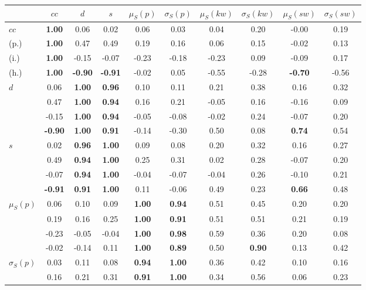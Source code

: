 \begin{table*}[h!]
\begin{center}
\begin{tabular}{| l || c | c | c | c | c | c | c | c | c |}\hline
 & $cc$ & $d$ & $s$ & $\mu_S(p)$ & $\sigma_S(p)$ & $\mu_S(kw)$ & $\sigma_S(kw)$ & $\mu_S(sw)$ & $\sigma_S(sw)$ \\\hline\hline
$cc$ & {\bf 1.00} & 0.06 & 0.02 & 0.06 & 0.03 & 0.04 & 0.20 & -0.00 & 0.19 \\
(p.) & {\bf 1.00} & 0.47 & 0.49 & 0.19 & 0.16 & 0.06 & 0.15 & -0.02 & 0.13 \\
(i.) & {\bf 1.00} & -0.15 & -0.07 & -0.23 & -0.18 & -0.23 & 0.09 & -0.09 & 0.17 \\
(h.) & {\bf 1.00} & {\bf -0.90} & {\bf -0.91} & -0.02 & 0.05 & -0.55 & -0.28 & {\bf -0.70} & -0.56 \\\hline
$d$ & 0.06 & {\bf 1.00} & {\bf 0.96} & 0.10 & 0.11 & 0.21 & 0.38 & 0.16 & 0.32 \\
 & 0.47 & {\bf 1.00} & {\bf 0.94} & 0.16 & 0.21 & -0.05 & 0.16 & -0.16 & 0.09 \\
 & -0.15 & {\bf 1.00} & {\bf 0.94} & -0.05 & -0.08 & -0.02 & 0.24 & -0.07 & 0.20 \\
 & {\bf -0.90} & {\bf 1.00} & {\bf 0.91} & -0.14 & -0.30 & 0.50 & 0.08 & {\bf 0.74} & 0.54 \\\hline
$s$ & 0.02 & {\bf 0.96} & {\bf 1.00} & 0.09 & 0.08 & 0.20 & 0.32 & 0.16 & 0.27 \\
 & 0.49 & {\bf 0.94} & {\bf 1.00} & 0.25 & 0.31 & 0.02 & 0.28 & -0.07 & 0.20 \\
 & -0.07 & {\bf 0.94} & {\bf 1.00} & -0.04 & -0.07 & -0.04 & 0.26 & -0.10 & 0.21 \\
 & {\bf -0.91} & {\bf 0.91} & {\bf 1.00} & 0.11 & -0.06 & 0.49 & 0.23 & {\bf 0.66} & 0.48 \\\hline
$\mu_S(p)$ & 0.06 & 0.10 & 0.09 & {\bf 1.00} & {\bf 0.94} & 0.51 & 0.45 & 0.20 & 0.20 \\
 & 0.19 & 0.16 & 0.25 & {\bf 1.00} & {\bf 0.91} & 0.51 & 0.51 & 0.21 & 0.19 \\
 & -0.23 & -0.05 & -0.04 & {\bf 1.00} & {\bf 0.98} & 0.59 & 0.36 & 0.20 & 0.08 \\
 & -0.02 & -0.14 & 0.11 & {\bf 1.00} & {\bf 0.89} & 0.50 & {\bf 0.90} & 0.13 & 0.42 \\\hline
$\sigma_S(p)$ & 0.03 & 0.11 & 0.08 & {\bf 0.94} & {\bf 1.00} & 0.36 & 0.42 & 0.10 & 0.16 \\
 & 0.16 & 0.21 & 0.31 & {\bf 0.91} & {\bf 1.00} & 0.34 & 0.56 & 0.06 & 0.23 \\

\end{tabular}
\end{center}
\end{table*}
